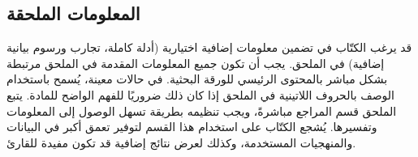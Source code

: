 \documentclass[12pt]{article}
\begin{document}
\subsection{المعلومات الملحقة}

قد يرغب الكتّاب في تضمين معلومات إضافية اختيارية (أدلة كاملة، تجارب ورسوم بيانية إضافية) في الملحق. يجب أن تكون جميع المعلومات المقدمة في الملحق مرتبطة بشكل مباشر بالمحتوى الرئيسي للورقة البحثية. في حالات معينة، يُسمح باستخدام الوصف بالحروف اللاتينية في الملحق إذا كان ذلك ضروريًا للفهم الواضح للمادة. يتبع الملحق قسم المراجع مباشرةً، ويجب تنظيمه بطريقة تسهل الوصول إلى المعلومات وتفسيرها. يُشجع الكتّاب على استخدام هذا القسم لتوفير تعمق أكبر في البيانات والمنهجيات المستخدمة، وكذلك لعرض نتائج إضافية قد تكون مفيدة للقارئ.



\end{document}
